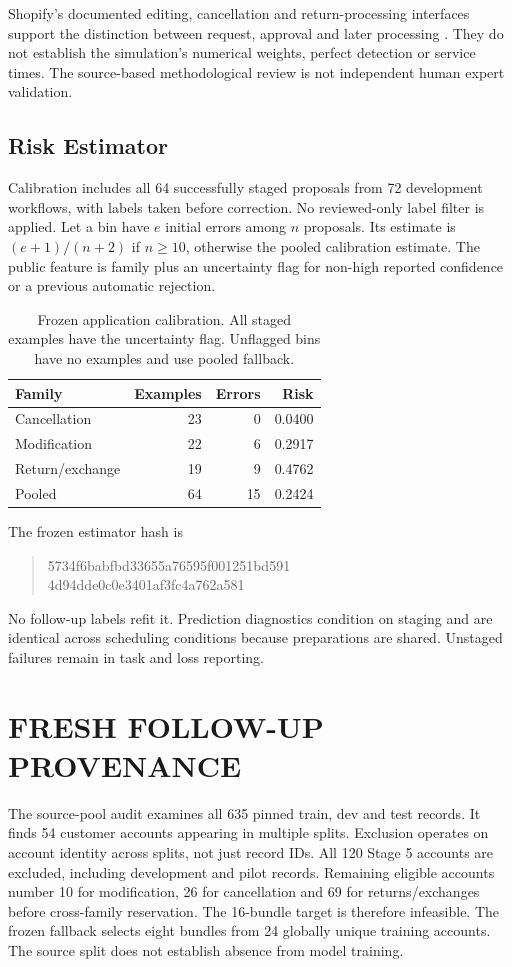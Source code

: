 Shopify's documented editing, cancellation and return-processing interfaces support the distinction between request, approval and later processing \cite{shopify2026editing,shopify2026cancel,shopify2026returns}. They do not establish the simulation's numerical weights, perfect detection or service times. The source-based methodological review is not independent human expert validation.

\subsection{Risk Estimator}
Calibration includes all 64 successfully staged proposals from 72 development workflows, with labels taken before correction. No reviewed-only label filter is applied. Let a bin have $e$ initial errors among $n$ proposals. Its estimate is $(e+1)/(n+2)$ if $n\geq 10$, otherwise the pooled calibration estimate. The public feature is family plus an uncertainty flag for non-high reported confidence or a previous automatic rejection.

\begin{table}[t]
\caption{Frozen application calibration. All staged examples have the uncertainty flag. Unflagged bins have no examples and use pooled fallback.}
\centering\small
\begin{tabular}{lrrr}
\toprule
Family & Examples & Errors & Risk \\
\midrule
Cancellation & 23 & 0 & 0.0400 \\
Modification & 22 & 6 & 0.2917 \\
Return/exchange & 19 & 9 & 0.4762 \\
Pooled & 64 & 15 & 0.2424 \\
\bottomrule
\end{tabular}
\end{table}

The frozen estimator hash is
\begin{quote}\small\ttfamily
5734f6babfbd33655a76595f001251bd591\\
4d94dde0c0e3401af3fc4a762a581
\end{quote}
No follow-up labels refit it. Prediction diagnostics condition on staging and are identical across scheduling conditions because preparations are shared. Unstaged failures remain in task and loss reporting.

\section{FRESH FOLLOW-UP PROVENANCE}
\noindent The source-pool audit examines all 635 pinned train, dev and test records. It finds 54 customer accounts appearing in multiple splits. Exclusion operates on account identity across splits, not just record IDs. All 120 Stage 5 accounts are excluded, including development and pilot records. Remaining eligible accounts number 10 for modification, 26 for cancellation and 69 for returns/exchanges before cross-family reservation. The 16-bundle target is therefore infeasible. The frozen fallback selects eight bundles from 24 globally unique training accounts. The source split does not establish absence from model training.\draftcredit

